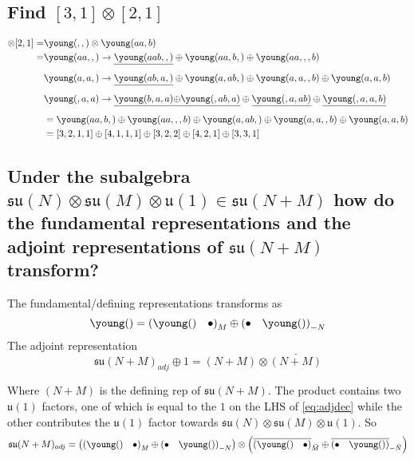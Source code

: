 \documentclass[main.tex]{subfiles}
\begin{document}
\subsection{Find $[3,1]\otimes[2,1]$} 
\begin{align}
[3,1]\otimes[2,1]=&\young(\hfil\hfil,\hfil,\hfil)\otimes\young(aa,b)\\
=&\young(\hfil\hfil aa,\hfil,\hfil)\rightarrow\sout{\young(\hfil\hfil aab,\hfil,\hfil)}\oplus\young(\hfil\hfil aa,\hfil b,\hfil)\oplus\young(\hfil\hfil aa,\hfil,\hfil,b)\nonumber\\
&\young(\hfil\hfil a,\hfil a,\hfil)\rightarrow\sout{\young(\hfil\hfil ab,\hfil a,\hfil)}\oplus\young(\hfil\hfil a,\hfil ab,\hfil)\oplus\young(\hfil\hfil a,\hfil a,\hfil,b)\oplus\young(\hfil\hfil a,\hfil a,\hfil b)\\
&\young(\hfil\hfil,\hfil a,\hfil a)\rightarrow\sout{\young(\hfil\hfil b,\hfil a,\hfil a)}\sout{\oplus\young(\hfil\hfil,\hfil ab,\hfil a)}\oplus\sout{\young(\hfil\hfil,\hfil a,\hfil ab)}\oplus\sout{\young(\hfil\hfil,\hfil a,\hfil a,b)}\nonumber\\
%
&=\young(\hfil\hfil aa,\hfil b,\hfil)\oplus\young(\hfil\hfil aa,\hfil,\hfil,b)
\oplus\young(\hfil\hfil a,\hfil ab,\hfil)\oplus\young(\hfil\hfil a,\hfil a,\hfil,b)\oplus\young(\hfil\hfil a,\hfil a,\hfil b)\\
&=[3,2,1,1]\oplus[4,1,1,1]\oplus[3,2,2]\oplus[4,2,1]\oplus[3,3,1]
\end{align}

\subsection{Under the subalgebra $\mathfrak{su}(N)\otimes\mathfrak{su}(M)\otimes\mathfrak{u}(1)\in\mathfrak{su}(N+M)$ how do the fundamental representations and the adjoint representations of $\mathfrak{su}(N+M)$ transform?} 

The fundamental/defining representations transforms as
\begin{equation}
\young(\hfil)=\left(\young(\hfil)\quad \bullet\right)_{M} \oplus \left( \bullet\quad \young(\hfil)\right)_{-N}
\end{equation}
The adjoint representation
\begin{equation}\label{eq:adjdec}
\mathfrak{su}(N+M)_{adj}\oplus1=(N+M)\otimes\bar{(N+M)}
\end{equation}

Where $(N+M)$ is the defining rep of $\mathfrak{su}(N+M)$. The product contains two $\mathfrak{u}(1)$ factors, one of which is equal to the $1$ on the LHS of \eqref{eq:adjdec} while the other contributes the $\mathfrak{u}(1)$ factor towards $\mathfrak{su}(N)\otimes\mathfrak{su}(M)\otimes\mathfrak{u}(1)$. So
\begin{equation}
\mathfrak{su}(N+M)_{adj}=\left(\left(\young(\hfil)\quad \bullet\right)_{M} \oplus \left( \bullet\quad \young(\hfil)\right)_{-N}\right)\otimes\left(\overline{\left(\young(\hfil)\quad \bullet\right)}_{\bar{M}} \oplus  \overline{\left(\bullet\quad \young(\hfil)\right)}_{-\bar{N}}\right)
\end{equation}
\end{document}
